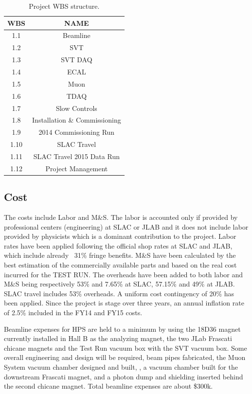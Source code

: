 \begin{table}[htdp]
\caption{Project WBS structure.}
\begin{center}
\begin{tabular}{|c|c|}
\hline
WBS& NAME \\
\hline\hline
1.1 & Beamline \\
\hline
1.2 & SVT \\
\hline
1.3 & SVT DAQ \\
\hline
1.4 & ECAL \\
\hline
1.5 & Muon \\
\hline
1.6 & TDAQ \\
\hline
1.7 & Slow Controls \\
\hline
1.8 & Installation \& Commissioning \\
\hline
1.9 & 2014 Commissioning Run \\
\hline
1.10 & SLAC Travel \\
\hline
1.11 & SLAC Travel 2015 Data Run \\
1.12 & Project Management  \\
\hline
\hline
\end{tabular}
\end{center}
\label{tb:wbs}
\end{table}%

\subsection{Cost}

The costs include Labor and M\&S. The labor is accounted only if provided by professional centers (engineering) at SLAC or JLAB and it does not include labor provided by physicists which is a dominant contribution to the  project. Labor rates have been applied following the official shop rates at SLAC and JLAB, which include already ~31\% fringe benefits. M\&S have been calculated by the best estimation of the commercially available parts and based on the real cost incurred for the TEST RUN. The overheads have been added to both labor and M\&S being respectively 53\% and 7.65\% at SLAC, 57.15\% and 49\% at JLAB. SLAC travel includes 53\% overheads. A uniform cost contingency of 20\% has been applied. Since the project is stage over three years, an annual inflation rate of 2.5\%  included in the FY14 and FY15 costs.

Beamline expenses for HPS are held to a minimum by using the 18D36 magnet currently installed in Hall B as the analyzing magnet, the two JLab Frascati chicane magnets and the Test Run vacuum box with the SVT vacuum box.  Some overall engineering and design will be required, beam pipes fabricated, the Muon System vacuum chamber designed and built, , a vacuum chamber built for the downstream Frascati magnet, and a photon dump and shielding inserted behind the second chicane magnet. Total beamline expenses are about \$300k.

